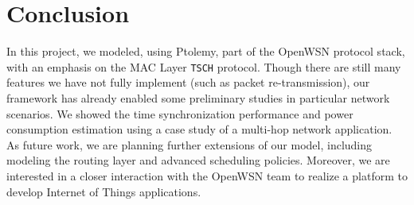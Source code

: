 
\section{Conclusion}
\label{sec:conclusion}

In this project, we modeled, using Ptolemy, part of the OpenWSN protocol stack, with an emphasis on the MAC Layer \texttt{TSCH} protocol. Though there are still many features we have not fully implement (such as packet re-transmission), our framework has already enabled some preliminary studies in particular network scenarios. We showed the time synchronization performance and power consumption estimation using a case study of a multi-hop network application.
As future work, we are planning further extensions of our model, including modeling the routing layer and advanced scheduling policies. Moreover, we are interested in a closer interaction with the OpenWSN team to realize a platform to develop Internet of Things applications.

